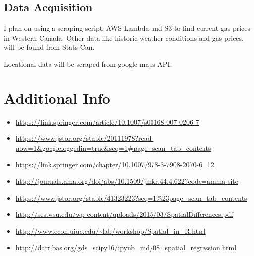 \documentclass[11pt]{article}
\begin{document}
\subsection{Data Acquisition}
\label{sec:org7030e06}

I plan on using a scraping script, AWS Lambda and S3 to find current gas prices
in Western Canada. Other data like historic weather conditions and gas prices,
will be found from Stats Can. 

Locational data will be scraped from google maps API.


\section{Additional Info}
\label{sec:orgae35d99}

\begin{itemize}
\item \url{https://link.springer.com/article/10.1007/s00168-007-0206-7}
\item \url{https://www.jstor.org/stable/20111978?read-now=1\&googleloggedin=true\&seq=1\#page\_scan\_tab\_contents}
\item \url{https://link.springer.com/chapter/10.1007/978-3-7908-2070-6\_12}
\item \url{http://journals.ama.org/doi/abs/10.1509/jmkr.44.4.622?code=amma-site}
\item \url{https://www.jstor.org/stable/41323223?seq=1\%23page\_scan\_tab\_contents}
\item \url{http://ses.wsu.edu/wp-content/uploads/2015/03/SpatialDifferences.pdf}
\item \url{http://www.econ.uiuc.edu/\~lab/workshop/Spatial\_in\_R.html}
\item \url{http://darribas.org/gds\_scipy16/ipynb\_md/08\_spatial\_regression.html}
\end{itemize}
\end{document}
